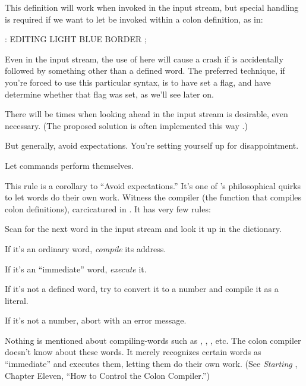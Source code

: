 This definition will work when invoked in the input stream, but special
handling is required if we want to let  be invoked within a
colon definition, as in:
\begin{Code}
: EDITING   LIGHT BLUE BORDER ;
\end{Code}
Even in the input stream, the use of  here will cause
a crash if  is accidentally followed by something other than a
defined word.  The preferred technique, if you're forced to use this
particular syntax, is to have  set a flag, and have 
determine whether that flag was set, as we'll see later on.

There will be times when looking ahead in the input stream is desirable,
even necessary. (The proposed  solution is often implemented
this way \cite{rosen82}.)

But generally, avoid expectations. You're setting yourself up for
disappointment.

\begin{tip}
Let commands perform themselves.
\end{tip}%
This rule is a corollary to ``Avoid expectations.'' It's one of
\Forth{}'s philosophical quirks to let words do their own work. Witness
the \Forth{} compiler (the function that compiles colon definitions),
carcicatured in . It has very few rules:



\begin{tfquot}
Scan for the next word in the input stream and look it up in the dictionary.

If it's an ordinary word, \emph{compile} its address.

If it's an ``immediate'' word, \emph{execute} it.

If it's not a defined word, try to convert it to a number and compile it as a
literal.

If it's not a number, abort with an error message.
\end{tfquot}
Nothing is mentioned about compiling-words such as , ,
, etc. The colon compiler doesn't know about these words. It merely
recognizes certain words as ``immediate'' and executes them, letting
them do their own work. (See \emph{Starting \Forth{}}, Chapter Eleven, ``How to
Control the Colon Compiler.'')

